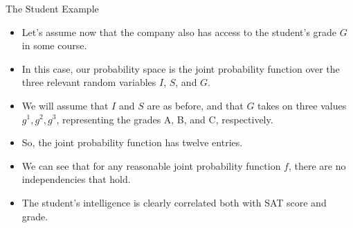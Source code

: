 \documentclass[handout]{beamer}
\begin{document}
\begin{frame}{The Student Example}
\scriptsize{
\begin{itemize}

\item Let's assume now that the company also has access to the student's grade $G$ in some course. 
\item In this case, our probability space is the joint probability function over the
three relevant random variables $I$, $S$, and $G$. 

\item We will assume that $I$ and $S$ are as before, and that $G$ takes on three values $g^1, g^2, g^3$, representing the grades A, B, and C, respectively.

\item So, the joint probability function  has twelve entries.

\item We can see that for any reasonable joint probability function  $f$, there are no independencies that hold.
\item The student's intelligence is clearly correlated both with SAT score and  grade.


\end{itemize}



} 

\end{frame}
\end{document}
